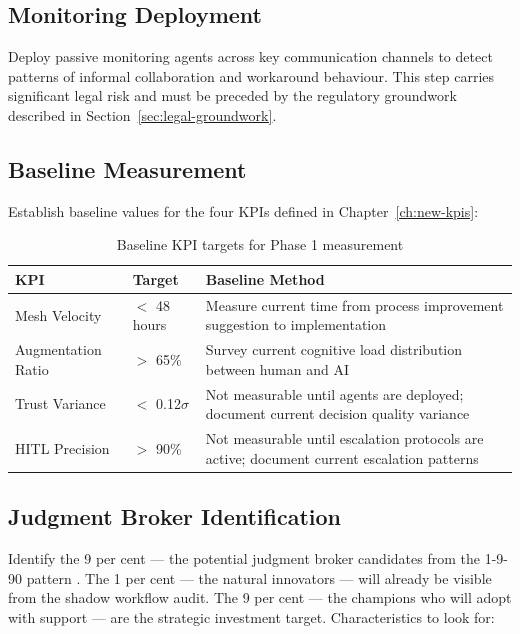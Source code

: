\subsection{Monitoring Deployment}

Deploy passive monitoring agents across key communication channels to detect patterns of informal collaboration and workaround behaviour. This step carries significant legal risk and must be preceded by the regulatory groundwork described in Section~\ref{sec:legal-groundwork}.

\subsection{Baseline Measurement}

Establish baseline values for the four KPIs defined in Chapter~\ref{ch:new-kpis}:

\begin{table}[h]
\centering
\caption{Baseline KPI targets for Phase 1 measurement}
\label{tab:baseline-kpis}
\begin{tabularx}{\textwidth}{l l X}
\toprule
\textbf{KPI} & \textbf{Target} & \textbf{Baseline Method} \\
\midrule
Mesh Velocity & $<$ 48 hours & Measure current time from process improvement suggestion to implementation \\
\addlinespace
Augmentation Ratio & $>$ 65\% & Survey current cognitive load distribution between human and AI \\
\addlinespace
Trust Variance & $<$ 0.12$\sigma$ & Not measurable until agents are deployed; document current decision quality variance \\
\addlinespace
HITL Precision & $>$ 90\% & Not measurable until escalation protocols are active; document current escalation patterns \\
\bottomrule
\end{tabularx}
\end{table}

\subsection{Judgment Broker Identification}

Identify the 9 per cent --- the potential judgment broker candidates from the 1-9-90 pattern \parencite{BCGAgenticShift2025}. The 1 per cent --- the natural innovators --- will already be visible from the shadow workflow audit. The 9 per cent --- the champions who will adopt with support --- are the strategic investment target. Characteristics to look for:


